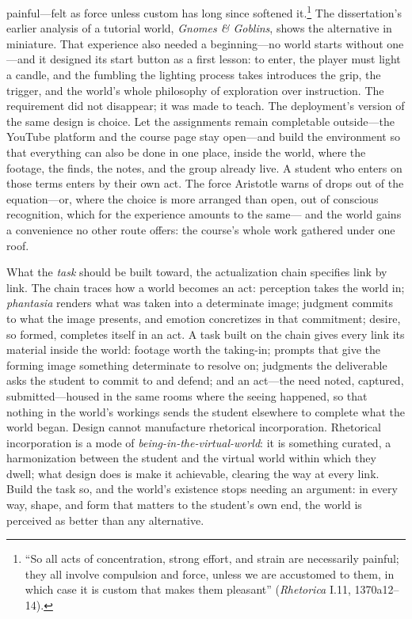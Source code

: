 painful---felt as force unless custom has long since softened
it.\footnote{``So all acts of concentration, strong effort, and strain
are necessarily painful; they all involve compulsion and force, unless
we are accustomed to them, in which case it is custom that makes them
pleasant'' (\textit{Rhetorica} I.11, 1370a12--14).} The dissertation's
earlier analysis of a tutorial world, \textit{Gnomes \& Goblins},
shows the alternative in miniature. That experience also needed a
beginning---no world starts without one---and it designed its start
button as a first lesson: to enter, the player must light a candle,
and the fumbling the lighting process takes introduces the grip, the trigger,
and the world's whole philosophy of exploration over instruction. The
requirement did not disappear; it was made to teach. The deployment's
version of the same design is choice. Let the assignments remain
completable outside---the YouTube platform and the course page stay
open---and build the environment so that everything can also be done
in one place, inside the world, where the footage, the finds, the
notes, and the group already live. A student who enters on those terms
enters by their own act. The force Aristotle warns of drops out of the
equation---or, where the choice is more arranged than open, out of
conscious recognition, which for the experience amounts to the same---
and the world gains a convenience no other route offers: the course's
whole work gathered under one roof.

What the \textit{task} should be built toward, the actualization chain
specifies link by link. The chain traces how a world becomes an act:
perception takes the world in; \textit{phantasia} renders what was
taken into a determinate image; judgment commits to what the image
presents, and emotion concretizes in that commitment; desire, so
formed, completes itself in an act. A task built on the chain gives
every link its material inside the world: footage worth the taking-in;
prompts that give the forming image something determinate to resolve
on; judgments the deliverable asks the student to commit to and
defend; and an act---the need noted, captured, submitted---housed in
the same rooms where the seeing happened, so that nothing in the
world's workings sends the student elsewhere to complete what the
world began. Design cannot manufacture rhetorical incorporation.
Rhetorical incorporation is a mode of
\textit{being-in-the-virtual-world}: it is something curated, a
harmonization between the student and the virtual world within which
they dwell; what design does is make it achievable, clearing the way
at every link.
Build the task so, and the world's existence stops needing an
argument: in every way, shape, and form that matters to the student's
own end, the world is perceived as better than any alternative.

